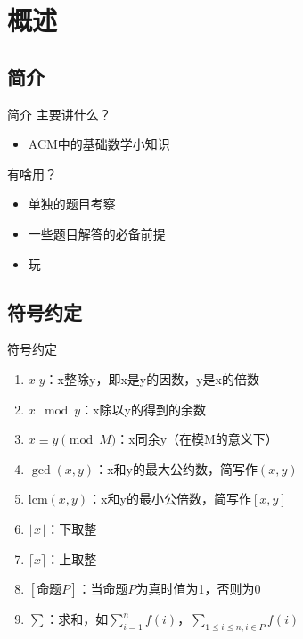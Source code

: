 \section{概述}
\subsection{简介}
\begin{frame}{简介}
主要讲什么？
\begin{itemize}
  \item ACM中的基础数学小知识
\end{itemize}
\pause
有啥用？
\begin{itemize}
  \item 单独的题目考察
  \item 一些题目解答的必备前提
  \item 玩
\end{itemize}
\end{frame}


\subsection{符号约定}
\begin{frame}{符号约定}
\begin{enumerate}
  \item $x|y$：x整除y，即x是y的因数，y是x的倍数
  \item $x\mod y$：x除以y的得到的余数
  \item $x\equiv y \pmod{M}$：x同余y（在模M的意义下）
  \item $\gcd(x,y)$：x和y的最大公约数，简写作$(x,y)$
  \item $\text{lcm}(x,y)$：x和y的最小公倍数，简写作$[x,y]$
  \item $\lfloor x \rfloor$：下取整
  \item $\lceil x \rceil$：上取整
  \item $[\text{命题}P]$：当命题$P$为真时值为1，否则为0
  \item $\sum$：求和，如$\sum\limits_{i=1}^{n}f(i)$，$\sum\limits_{1\leq i\leq n, i\in P}f(i)$
\end{enumerate}
\end{frame}